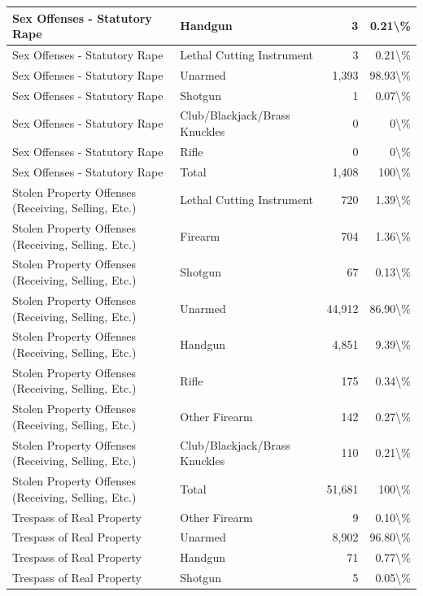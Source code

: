 \documentclass[
]{krantz}
\begin{document}
\begin{longtable}[t]{l|l|r|r}
\hline
Sex Offenses - Statutory Rape & Handgun & 3 & 0.21\textbackslash{}\%\\
\hline
Sex Offenses - Statutory Rape & Lethal Cutting Instrument & 3 & 0.21\textbackslash{}\%\\
\hline
Sex Offenses - Statutory Rape & Unarmed & 1,393 & 98.93\textbackslash{}\%\\
\hline
Sex Offenses - Statutory Rape & Shotgun & 1 & 0.07\textbackslash{}\%\\
\hline
Sex Offenses - Statutory Rape & Club/Blackjack/Brass Knuckles & 0 & 0\textbackslash{}\%\\
\hline
Sex Offenses - Statutory Rape & Rifle & 0 & 0\textbackslash{}\%\\
\hline
Sex Offenses - Statutory Rape & Total & 1,408 & 100\textbackslash{}\%\\
\hline
Stolen Property Offenses (Receiving, Selling, Etc.) & Lethal Cutting Instrument & 720 & 1.39\textbackslash{}\%\\
\hline
Stolen Property Offenses (Receiving, Selling, Etc.) & Firearm & 704 & 1.36\textbackslash{}\%\\
\hline
Stolen Property Offenses (Receiving, Selling, Etc.) & Shotgun & 67 & 0.13\textbackslash{}\%\\
\hline
Stolen Property Offenses (Receiving, Selling, Etc.) & Unarmed & 44,912 & 86.90\textbackslash{}\%\\
\hline
Stolen Property Offenses (Receiving, Selling, Etc.) & Handgun & 4,851 & 9.39\textbackslash{}\%\\
\hline
Stolen Property Offenses (Receiving, Selling, Etc.) & Rifle & 175 & 0.34\textbackslash{}\%\\
\hline
Stolen Property Offenses (Receiving, Selling, Etc.) & Other Firearm & 142 & 0.27\textbackslash{}\%\\
\hline
Stolen Property Offenses (Receiving, Selling, Etc.) & Club/Blackjack/Brass Knuckles & 110 & 0.21\textbackslash{}\%\\
\hline
Stolen Property Offenses (Receiving, Selling, Etc.) & Total & 51,681 & 100\textbackslash{}\%\\
\hline
Trespass of Real Property & Other Firearm & 9 & 0.10\textbackslash{}\%\\
\hline
Trespass of Real Property & Unarmed & 8,902 & 96.80\textbackslash{}\%\\
\hline
Trespass of Real Property & Handgun & 71 & 0.77\textbackslash{}\%\\
\hline
Trespass of Real Property & Shotgun & 5 & 0.05\textbackslash{}\%\\

\end{longtable}
\end{document}
